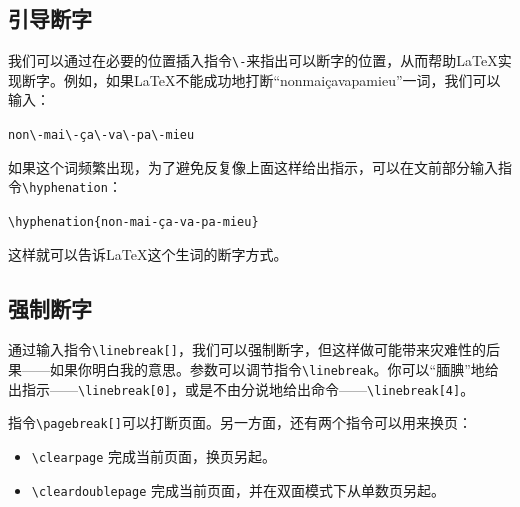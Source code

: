 \subsection{引导断字}

我们可以通过在必要的位置插入指令\verb|\-|来指出可以断字的位置，从而帮助\LaTeX 实现断字。例如，如果\LaTeX 不能成功地打断“nonmaiçavapamieu”一词，我们可以输入：

\begin{dmd}
\verb|non\-mai\-ça\-va\-pa\-mieu|
\end{dmd}

如果这个词频繁出现，为了避免反复像上面这样给出指示，可以在文前部分输入指令\linebreak \verb|\hyphenation|：

\begin{dmd}
\verb|\hyphenation{non-mai-ça-va-pa-mieu}|
\end{dmd}

这样就可以告诉\LaTeX 这个生词的断字方式。

\subsection{强制断字}

通过输入指令\verb|\linebreak[|\verb|]|，我们可以强制断字，但这样做可能带来灾难性的后果——如果你明白我的意思。参数可以调节指令\verb|\linebreak|。你可以“腼腆”地给出指示——\verb|\linebreak[0]|，或是不由分说地给出命令——\verb|\linebreak[4]|。

指令\verb|\pagebreak[|\verb|]|可以打断页面。另一方面，还有两个指令可以用来换页：

\begin{itemize}
  \item \verb|\clearpage| 完成当前页面，换页另起。
  \item \verb|\cleardoublepage| 完成当前页面，并在双面模式下从单数页另起。
\end{itemize}

